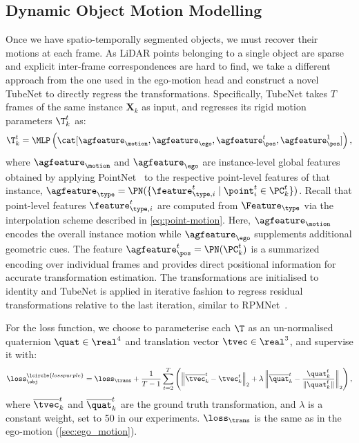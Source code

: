 \subsection{Dynamic Object Motion Modelling}
\label{sec:dynamic_obj}
Once we have spatio-temporally segmented objects, we must
recover their motions at each frame.
As LiDAR points belonging to a single object are sparse and explicit inter-frame correspondences are hard to find, we take a different approach from the one used in the ego-motion head and construct a novel TubeNet to directly regress the transformations.
Specifically, TubeNet takes $T$ frames of the same instance $\mathbf{X}_k$ as input, and regresses its rigid motion parameters $\T^t_k$ as:
\begin{equation}
    \T^t_k = \MLP \left(\cat[ \agfeature_{\motion}, \agfeature_\ego, \agfeature_{\pos}^t, \agfeature_{\pos}^1] \right),
    \label{eq:tubenet}
\end{equation}
where $\agfeature_\motion$ and $\agfeature_\ego$ are instance-level global features obtained by applying PointNet~\cite{qi2017pointnet} to the respective point-level features of that instance, $\agfeature_{\type} = \PN(\{ \feature_{\type,i}^t \; | \; \point_i^t \in \PC_k^t \})$.
Recall that point-level features $\feature_{\type,i}^t$ are computed from $\Feature_{\type}$ via the interpolation scheme described in \cref{eq:point-motion}.
Here, $\agfeature_\motion$ encodes the overall instance motion while $\agfeature_\ego$ supplements additional geometric cues. The feature
$\agfeature_\pos^t = \PN(\PC_k^t)$ is a summarized encoding over individual frames and provides direct positional information for accurate transformation estimation. 
%
The transformations are initialised to identity and TubeNet is applied in iterative fashion to regress residual transformations relative to the last iteration, similar to RPMNet~\cite{yew2020rpm}.

For the loss function, we choose to parameterise each $\T$ as an un-normalised quaternion $\quat \in \real^{4}$ and translation vector $\tvec \in \real^3$, and supervise it with:
\begin{equation}
    \loss_\obj^\lcircle{losspurple} = \loss_\trans + \frac{1}{T-1} \sum_{t=2}^T \left( \left\|\overline{\tvec}_k^t - \tvec_k^t \right\|_2 + \lambda \left\|\overline{\quat}_k^t - \frac{\quat_k^t}{{\|\quat_k^t}\|} \right\|_2 \right),
\end{equation}
where $\overline{\tvec}_k^t$ and $\overline{\quat}_k^t$ are the ground truth transformation, and $\lambda$ is a constant weight, set to 50 in our experiments. 
$\loss_\trans$ is the same as in the ego-motion (\cref{sec:ego_motion}).


